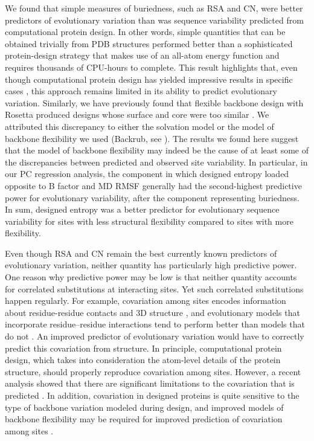 \documentclass[smallextended]{svjour3}
\begin{document}
We found that simple measures of buriedness, such as RSA and CN, were better predictors of evolutionary variation than was sequence variability predicted from computational protein design. In other words, simple quantities that can be obtained trivially from PDB structures performed better than a sophisticated protein-design strategy that makes use of an all-atom energy function and requires thousands of CPU-hours to complete. This result highlights that, even though computational protein design has yielded impressive results in specific cases \citep{Kuhlman2003,Rothlisberger2008,Fleishman2011}, this approach remains limited in its ability to predict evolutionary variation. Similarly, we have previously found that flexible backbone design with Rosetta produced designs whose surface and core were too similar \citep{Jacksonetal2013}. We attributed this discrepancy to either the solvation model or the model of backbone flexibility we used (Backrub, see \citealt{Smith2008}). The results we found here suggest that the model of backbone flexibility may indeed be the cause of at least some of the discrepancies between predicted and observed site variability. In particular, in our PC regression analysis, the component in which designed entropy loaded opposite to B factor and MD RMSF generally had the second-highest predictive power for evolutionary variability, after the component representing buriedness. In sum, designed entropy was a better predictor for evolutionary sequence variability for sites with less structural flexibility compared to sites with more flexibility.

Even though RSA and CN remain the best currently known predictors of evolutionary variation, neither quantity has particularly high predictive power. One reason why predictive power may be low is that neither quantity accounts for correlated substitutions at interacting sites.  Yet such correlated substitutions happen regularly. For example, covariation among sites encodes information about residue-residue contacts and 3D structure \citep{Halabietal2009,BurgervanNimwegen2010,Marksetal2011,Jonesetal2014}, and evolutionary models that incorporate residue--residue interactions tend to perform better than models that do not \citep{Rodrigueetal2005,BordnerMittelmann2014}. An improved predictor of evolutionary variation would have to correctly predict this covariation from structure. In principle, computational protein design, which takes into consideration the atom-level details of the protein structure, should properly reproduce covariation among sites. However, a recent analysis showed that there are significant limitations to the covariation that is predicted \citep{OllikainenKortemme2013}. In addition, covariation in designed proteins is quite sensitive to the type of backbone variation modeled during design, and improved models of backbone flexibility may be required for improved prediction of covariation among sites \citep{OllikainenKortemme2013}.
\end{document}
